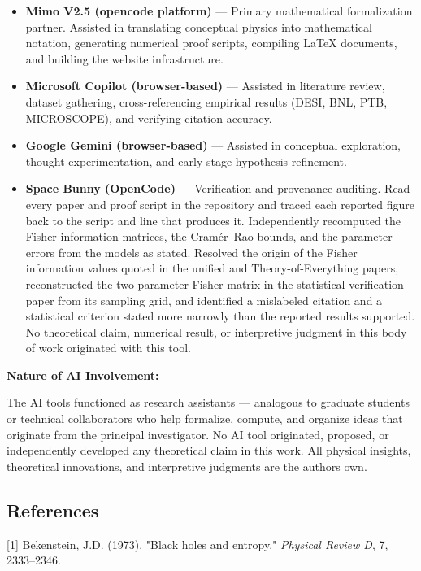 \documentclass[
  10pt,
]{article}
\providecommand{\tightlist}{%
  \setlength{\itemsep}{0pt}\setlength{\parskip}{0pt}}
\begin{document}
\begin{itemize}
\tightlist
\item
  \textbf{Mimo V2.5 (opencode platform)} --- Primary mathematical
  formalization partner. Assisted in translating conceptual physics into
  mathematical notation, generating numerical proof scripts, compiling
  LaTeX documents, and building the website infrastructure.
\item
  \textbf{Microsoft Copilot (browser-based)} --- Assisted in literature
  review, dataset gathering, cross-referencing empirical results (DESI,
  BNL, PTB, MICROSCOPE), and verifying citation accuracy.
\item
  \textbf{Google Gemini (browser-based)} --- Assisted in conceptual
  exploration, thought experimentation, and early-stage hypothesis
  refinement.
\item
  \textbf{Space Bunny (OpenCode)} --- Verification and provenance
  auditing. Read every paper and proof script in the repository and
  traced each reported figure back to the script and line that produces
  it. Independently recomputed the Fisher information matrices, the
  Cramér--Rao bounds, and the parameter errors from the models as
  stated. Resolved the origin of the Fisher information values quoted in
  the unified and Theory-of-Everything papers, reconstructed the
  two-parameter Fisher matrix in the statistical verification paper from
  its sampling grid, and identified a mislabeled citation and a
  statistical criterion stated more narrowly than the reported results
  supported. No theoretical claim, numerical result, or interpretive
  judgment in this body of work originated with this tool.
\end{itemize}

\textbf{Nature of AI Involvement:}

The AI tools functioned as research assistants --- analogous to graduate
students or technical collaborators who help formalize, compute, and
organize ideas that originate from the principal investigator. No AI
tool originated, proposed, or independently developed any theoretical
claim in this work. All physical insights, theoretical innovations, and
interpretive judgments are the author\textquotesingle s own.

\hypertarget{references}{%
\subsection{References}\label{references}}

{[}1{]} Bekenstein, J.D. (1973). "Black holes and entropy."
\emph{Physical Review D}, 7, 2333--2346.
\end{document}
